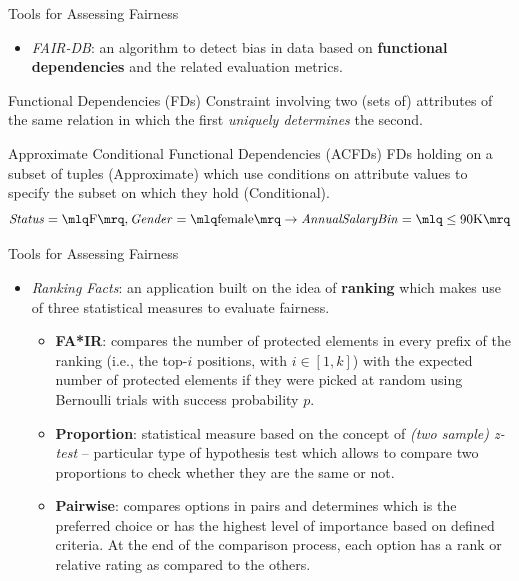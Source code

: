\documentclass[usenames,dvipsnames]{beamer}
\begin{document}
    
    \begin{frame}{Tools for Assessing Fairness}
        \begin{itemize}
            \item \textit{FAIR-DB}: an algorithm to detect bias in data based on \textbf{functional dependencies} and the related evaluation metrics. \emph{\parencite{azzalini2021fair}}
        \end{itemize}
        \begin{block}{Functional Dependencies (FDs)}
            Constraint involving two (sets of) attributes of the same relation in which the first \textit{uniquely determines} the second.
        \end{block}
        \begin{block}{Approximate Conditional Functional Dependencies (ACFDs)}
            FDs holding on a subset of tuples (Approximate) which use conditions on attribute values to specify the subset on which they hold (Conditional).
            \[\mathit{Status} = \mlq \mathrm{F} \mrq, \mathit{Gender} = \mlq \mathrm{female} \mrq \rightarrow \mathit{Annual Salary Bin} = \mlq \leq \mathrm{90K} \mrq\]
        \end{block}
    \end{frame}
    
    
    \begin{frame}{Tools for Assessing Fairness}
        \begin{itemize}
            \item \textit{Ranking Facts}: an application built on the idea of \textbf{ranking} which makes use of three statistical measures to evaluate fairness. \emph{\parencite{yang2018nutritional}}
            \begin{itemize}
                \item \textbf{FA*IR}: compares the number of protected elements in every prefix of the ranking (i.e., the top-\(i\) positions, with \(i \in [1, k]\)) with the expected number of protected elements if they were picked at random using Bernoulli trials with success probability \(p\).
                \item \textbf{Proportion}: statistical measure based on the concept of \textit{(two sample) z-test} -- particular type of hypothesis test which allows to compare two proportions to check whether they are the same or not.
                \item \textbf{Pairwise}: compares options in pairs and determines which is the preferred choice or has the highest level of importance based on defined criteria. At the end of the comparison process, each option has a rank or relative rating as compared to the others.
            \end{itemize}
        \end{itemize}
    \end{frame}
    
\end{document}
